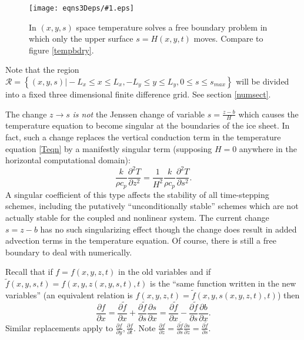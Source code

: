 \documentclass{amsart}%
\theoremstyle{plain}
\theoremstyle{definition}
\theoremstyle{remark}
\newcommand{\regfigure}[2]{\texttt{[image: eqns3Deps/\#1.eps]}}
\newcommand{\ddt}[1]{\ensuremath{\frac{\partial #1}{\partial t}}}
\newcommand{\ddx}[1]{\ensuremath{\frac{\partial #1}{\partial x}}}
\newcommand{\ddy}[1]{\ensuremath{\frac{\partial #1}{\partial y}}}
\newcommand{\ddz}[1]{\ensuremath{\frac{\partial #1}{\partial z}}}
\newcommand{\dds}[1]{\ensuremath{\frac{\partial #1}{\partial s}}}
\begin{document}
\begin{figure}[ht]
\vspace{-2mm}
\regfigure{stempbdryfig}{3}
\vspace{-4mm}
\caption{In $(x,y,s)$ space temperature solves a free boundary problem in which only the upper surface $s=H(x,y,t)$ moves.  Compare to figure \ref{tempbdry}.}
\label{stempbdry}
\end{figure}

Note that the region $\mathcal{R}=\left\{(x,y,s)\big| -L_x\le x \le L_x, -L_y\le y \le L_y, 0\le s \le s_{max}\right\}$ will be divided into a fixed three dimensional finite difference grid.  See section \ref{numsect}.

The change $z\to s$ \emph{is not} the Jenssen \cite{Jenssen} change of variable $s=\frac{z-b}{H}$ which causes the temperature equation to become singular at the boundaries of the ice sheet.  In fact, such a change replaces the vertical conduction term in the temperature equation \eqref{Teqn} by a manifestly singular term (supposing $H=0$ anywhere in the horizontal computational domain):
    $$\frac{k}{\rho c_p} \frac{\partial^2 T}{\partial z^2} = \frac{1}{H^2} \frac{k}{\rho c_p} \frac{\partial^2 T}{\partial s^2}.$$
A singular coefficient of this type affects the stability of all time-stepping schemes, including the putatively ``unconditionally stable'' schemes which are not actually stable for the coupled and nonlinear system.  The current change $s=z-b$ has no such singularizing effect though the change does result in added advection terms in the temperature equation.  Of course, there is still a free boundary to deal with numerically.

Recall that if $f=f(x,y,z,t)$ in the old variables and if $\tilde f(x,y,s,t)=f(x,y,z(x,y,s,t),t)$ is the ``same function written in the new variables'' (an equivalent relation is $f(x,y,z,t)=\tilde f(x,y,s(x,y,z,t),t)$) then
    $$\ddx{f} = \ddx{\tilde f}+\dds{\tilde f}\ddx{s} = \ddx{\tilde f}-\dds{\tilde f}\ddx{b}.$$
Similar replacements apply to $\ddy{f},\ddt{f}$. Note $\ddz{f}=\dds{\tilde f} \ddz{s} = \dds{\tilde f}$.
\end{document}
